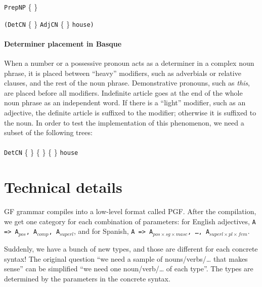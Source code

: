 \documentclass[11pt]{article}
\def\t#1{\texttt{#1}}
\newcommand{\tts}[1]{{\tt #1}}
\begin{document}
 \t{PrepNP} \{  \} {\t{(DetCN} \{  \} \t{AdjCN} \{  \} {\tt house)}



\paragraph{Determiner placement in Basque} When a number or a possessive pronoun acts as a determiner in a complex noun phrase, it is placed
between ``heavy'' modifiers, such as adverbials or relative clauses, and the rest of the noun phrase. Demonstrative pronouns, such as \emph{this},
 are placed before all modifiers. Indefinite article goes at the end of the whole noun phrase as an independent word.
If there is a ``light'' modifier, such as an adjective, the definite article is suffixed to the modifier; otherwise it is suffixed to the noun.
In order to test the implementation of this phenomenon, we need a subset of the following trees: \\ \\
\t{DetCN} \{ \stackanchor{\stackanchor{\tts{a}}{\tts{the}}}{\stackanchor{\tts{this}}{\tts{your}}} \} \{  \} \{  \}  {\tt house}



\section{Technical details}
\label{sec:details}

GF grammar compiles into a low-level format called PGF. After the
compilation, we get one category for each combination of parameters:
for English adjectives, \texttt{A => A$_{pos}$, A$_{comp}$,
A$_{superl}$}, and for Spanish, \texttt{A => A$_{pos×sg×masc}$, \dots,
A$_{superl×pl×fem}$}. 

Suddenly, we have a bunch of new types, and those are different for
each concrete syntax! The original question ``we need a sample of
nouns/verbs/… that makes sense'' can be simplified ``we need one
noun/verb/… of each type''. The types are determined by the parameters
in the concrete syntax. 

}
\end{document}
